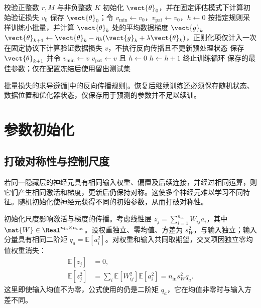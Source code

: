 \documentclass[../textbook.tex]{subfiles}
\begin{document}
\begin{algorithm}[带验证集早停的小批量梯度下降]
\label{alg:opt-sgd}
\begin{myalgorithmic}[1]
\State 校验正整数 $r, M$ 与非负整数 $K$
\State 初始化 $\vect{\theta}_0$，并在固定评估模式下计算初始验证损失 $v_0$
\State 保存 $\vect{\theta}_0$；令 $v_{\min}\gets v_0$，$v_{\mathrm{pat}}\gets v_0$，$h\gets0$
  \State 按指定规则采样训练小批量，并计算 $\vect{\theta}_k$ 处的平均数据梯度 $\vect{g}_k$
  \State $\vect{\theta}_{k+1}\gets\vect{\theta}_k-\eta_k(\vect{g}_k+\lambda\vect{\theta}_k)$，正则化项仅计入一次
    \State 在固定协议下计算验证数据损失 $v$，不执行反向传播且不更新预处理状态
      \State 保存 $\vect{\theta}_{k+1}$ 并令 $v_{\min}\gets v$
    \EndIf
      \State $v_{\mathrm{pat}}\gets v$ 且 $h\gets0$
    \Else
      \State $h\gets h+1$
    \EndIf
      \State 终止训练循环
    \EndIf
  \EndIf
\EndFor
\State \Return 保存的最佳参数；仅在配置冻结后使用留出测试集
\end{myalgorithmic}
批量损失的求导遵循[中的反向传播规则]。恢复后继续训练还必须保存随机状态、数据位置和优化器状态，仅保存用于预测的参数并不足以续训。
\end{algorithm}

\section{参数初始化}

\subsection{打破对称性与控制尺度}
若同一隐藏层的神经元具有相同输入权重、偏置及后续连接，并经过相同运算，则它们产生相同激活和梯度，更新后仍保持对称。这使多个神经元难以学习不同特征。随机初始化使神经元获得不同的初始参数，从而打破对称性。

初始化尺度影响激活与梯度的传播。考虑线性层
$z_j=\sum_{i=1}^{n_{\mathrm{in}}}W_{ij}a_i$，其中 $\mat{W}\in\Real^{n_{\mathrm{in}}\times n_{\mathrm{out}}}$。设权重独立、零均值、方差为 $s_W^2$，与输入独立；输入分量具有相同二阶矩 $q_a=\mathbb E[a_i^2]$。对权重和输入共同取期望，交叉项因独立零均值权重消失：
\begin{equation}\label{eq:opt-forward-moment}
\begin{aligned}
 \mathbb E[z_j] &= 0, \\
 \mathbb E[z_j^2] &= \sum_i\mathbb E[W_{ij}^2]\mathbb E[a_i^2] = n_{\mathrm{in}}s_W^2q_a.
\end{aligned}
\end{equation}
这里即使输入均值不为零，公式使用的仍是二阶矩 $q_a$，它在均值非零时与输入方差不同。
\end{document}
